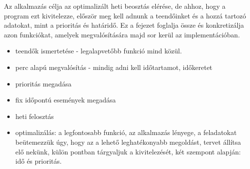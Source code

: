 

Az alkalmazás célja az optimalizált heti beosztás elérése, de ahhoz, hogy a program ezt kivitelezze, először meg kell adnunk a teendőinket és a hozzá tartozó adatokat, mint a prioritás és határidő. Ez a fejezet foglalja össze és konkretizálja azon funkciókat, amelyek megvalósítására majd sor kerül az implementációban.

\begin{itemize}
\item teendők ismertetése - legalapvetőbb funkció mind közül.
\item perc alapú megvalósítás - mindig adni kell időtartamot, időkeretet
\item prioritás megadása
\item fix időpontú események megadása
\item heti felosztás
\item optimalizálás: a legfontosabb funkció, az alkalmazás lényege, a feladatokat beütemezzük úgy, hogy az a lehető leghatékonyabb megoldást, tervet állítsa elő nekünk, külön pontban tárgyaljuk a kivitelezését, két szempont alapján: idő és prioritás.
\end{itemize}
